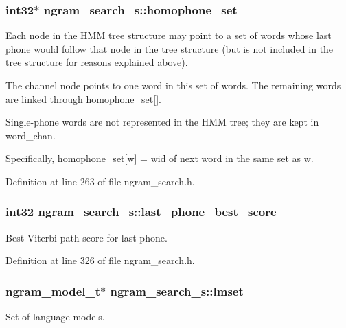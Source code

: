 \subsubsection[{homophone\-\_\-set}]{\setlength{\rightskip}{0pt plus 5cm}int32$\ast$ ngram\-\_\-search\-\_\-s\-::homophone\-\_\-set}\label{structngram__search__s_ab251bb3d0ddd33dd99ed390b61e481f2}


Each node in the H\-M\-M tree structure may point to a set of words whose last phone would follow that node in the tree structure (but is not included in the tree structure for reasons explained above). 

The channel node points to one word in this set of words. The remaining words are linked through homophone\-\_\-set[].

Single-\/phone words are not represented in the H\-M\-M tree; they are kept in word\-\_\-chan.

Specifically, homophone\-\_\-set[w] = wid of next word in the same set as w. 

Definition at line 263 of file ngram\-\_\-search.\-h.

\subsubsection[{last\-\_\-phone\-\_\-best\-\_\-score}]{\setlength{\rightskip}{0pt plus 5cm}int32 ngram\-\_\-search\-\_\-s\-::last\-\_\-phone\-\_\-best\-\_\-score}\label{structngram__search__s_a81ee45f3c184568e2b5f8b79c58e0b9e}


Best Viterbi path score for last phone. 



Definition at line 326 of file ngram\-\_\-search.\-h.

\subsubsection[{lmset}]{\setlength{\rightskip}{0pt plus 5cm}ngram\-\_\-model\-\_\-t$\ast$ ngram\-\_\-search\-\_\-s\-::lmset}\label{structngram__search__s_a6127a6d8fb53832e67456c11aa6ad9c4}


Set of language models. 



